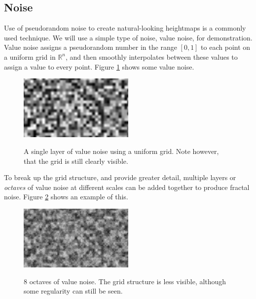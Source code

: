 \documentclass{article}
\begin{document}
\subsection{Noise}
Use of pseudorandom noise to create natural-looking heightmaps is a commonly used technique. We will use a simple type of noise, value noise, for demonstration. Value noise assigns a pseudorandom number in the range $\left[0,1\right]$ to each point on a uniform grid in $\mathbb{R}^n$, and then smoothly interpolates between these values to assign a value to every point. Figure \ref{fig:valuenoise1} shows some value noise.
\begin{figure}
  \caption{A single layer of value noise using a uniform grid. Note however, that the grid is still clearly visible.}
  \includegraphics[width=0.5\textwidth]{valuenoise1.png}
  \label{fig:valuenoise1}
\end{figure}
To break up the grid structure, and provide greater detail, multiple layers or \textit{octaves} of value noise at different scales can be added together to produce fractal noise. Figure \ref{fig:valuenoise} shows an example of this.
\begin{figure}
  \caption{8 octaves of value noise. The grid structure is less visible, although some regularity can still be seen.}
  \includegraphics[width=0.5\textwidth]{valuenoise.png}
  \label{fig:valuenoise}
\end{figure}
\end{document}
